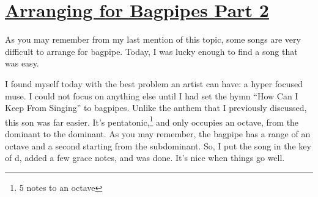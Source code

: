 \documentclass[12pt]{article}[titlepage]
\newcommand{\say}[1]{``#1''}
\newcommand{\1}{\={a}}
\newcommand{\2}{\={e}}
\newcommand{\3}{\={\i}}
\newcommand{\4}{\=o}
\newcommand{\5}{\=u}
\newcommand{\6}{\={A}}
\renewcommand{\,}{\textsuperscript{,}}
\begin{document}
\doublespacing

\section{\href{arranging-for-bagpipes-ii.html}{Arranging for Bagpipes Part 2}
}

As you may remember from my last mention of this topic, some songs are very difficult to arrange for bagpipe. Today, I was lucky enough to find a song that was easy.

I found myself today with the best problem an artist can have: a hyper focused muse. I could not focus on anything else until I had set the hymn \say{How Can I Keep From Singing} to bagpipes. Unlike the anthem that I previously discussed, this son was far easier. It’s pentatonic,\footnote{5 notes to an octave} and only occupies an octave, from the dominant to the dominant. As you may remember, the bagpipe has a range of an octave and a second starting from the subdominant. So, I put the song in the key of d, added a few grace notes, and was done. It’s nice when things go well.
\end{document}

